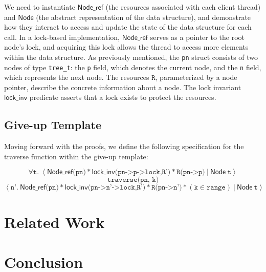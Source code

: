 \documentclass[a4paper,UKenglish,cleveref, autoref, thm-restate]{lipics-v2021}
\newcommand{\treerep}{\ensuremath{\mathsf{Node}}}
\newcommand{\nodeboxrep}{\ensuremath{\mathsf{Node\_ref}}}
\newcommand{\lockinv}{\ensuremath{\mathsf{lock\_inv}}}
\begin{document}
We need to instantiate $\nodeboxrep$ (the resources associated with each client thread) and $\treerep$ (the abstract representation of the data structure), and demonstrate how they interact to access and update the state of the data structure for each call. In a lock-based implementation, $\nodeboxrep$ serves as a pointer to the root node's lock, and acquiring this lock allows the thread to access more elements within the data structure. As previously mentioned, the \lstinline{pn} struct consists of two nodes of type \lstinline{tree_t}: the \lstinline{p} field, which denotes the current node, and the \lstinline{n} field, which represents the next node. The resources $\texttt{R}$, parameterized by a node pointer, describe the concrete information about a node. The lock invariant $\lockinv$ predicate asserts that a lock exists to protect the resources.

\subsection{Give-up Template}
Moving forward with the proofs, we define the following specification for the traverse function within the give-up template:

$$\forall \texttt{t}.\ \left\langle \nodeboxrep \texttt{(pn)} \ast \lockinv \texttt{(pn->p->lock,R'}) \ast \texttt{R(pn->p)} \ | \ \treerep\ \texttt{t} \right\rangle $$
$$\texttt{traverse(pn, k)}$$
$$\left\langle \texttt{n'}.\ \nodeboxrep \texttt{(pn)} \ast \lockinv \texttt{(pn->n'->lock,R')} \ast \texttt{R(pn->n')} \ast (\texttt{k} \in \texttt{range})
\ |\ \treerep\ \texttt{t} \right\rangle$$


\section{Related Work}

\section{Conclusion}







\end{document}
